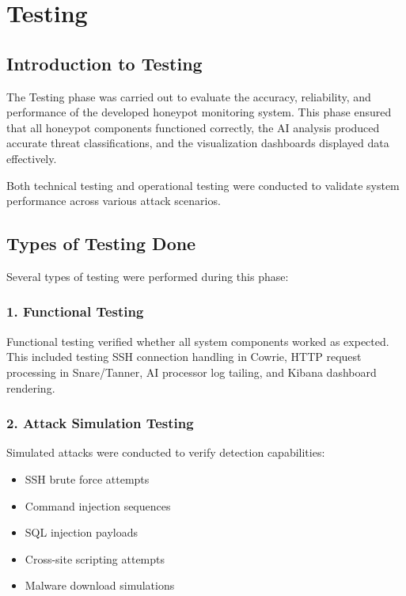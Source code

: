 \documentclass[12pt,a4paper]{report}
\begin{document}
\chapter{Testing}
\thispagestyle{mainpages}

\section{Introduction to Testing}

The Testing phase was carried out to evaluate the accuracy, reliability, and performance of the developed honeypot monitoring system. This phase ensured that all honeypot components functioned correctly, the AI analysis produced accurate threat classifications, and the visualization dashboards displayed data effectively.

Both technical testing and operational testing were conducted to validate system performance across various attack scenarios.

\section{Types of Testing Done}

Several types of testing were performed during this phase:

\subsection*{1. Functional Testing}

Functional testing verified whether all system components worked as expected. This included testing SSH connection handling in Cowrie, HTTP request processing in Snare/Tanner, AI processor log tailing, and Kibana dashboard rendering.

\subsection*{2. Attack Simulation Testing}

Simulated attacks were conducted to verify detection capabilities:
\begin{itemize}
\item SSH brute force attempts
\item Command injection sequences
\item SQL injection payloads
\item Cross-site scripting attempts
\item Malware download simulations
\end{itemize}
\end{document}
